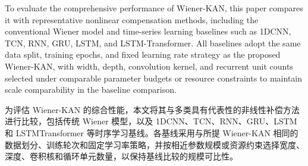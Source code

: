 \documentclass[sn-nature]{sn-jnl}
\newif\ifCNENEnglish
\newif\ifCNENBilingual
\newcommand{\CNEN}[2]{%
    \ifCNENBilingual
        #1%
        \if\relax\detokenize{#2}\relax\else\par #2\fi%
    \else
        \ifCNENEnglish
            #2%
        \else
            #1%
        \fi
    \fi
}
\begin{document}
\CNEN{为评估 Wiener-KAN 的综合性能，本文将其与多类具有代表性的非线性补偿方法进行比较，包括传统 Wiener 模型，以及 1DCNN、TCN、RNN、GRU、LSTM 和 LSTMTransformer 等时序学习基线。各基线采用与所提 Wiener-KAN 相同的数据划分、训练轮次和固定学习率策略，并按相近参数规模或资源约束选择宽度、深度、卷积核和循环单元数量，以保持基线比较的规模可比性。}{To evaluate the comprehensive performance of Wiener-KAN, this paper compares it with representative nonlinear compensation methods, including the conventional Wiener model and time-series learning baselines such as 1DCNN, TCN, RNN, GRU, LSTM, and LSTM-Transformer. All baselines adopt the same data split, training epochs, and fixed learning rate strategy as the proposed Wiener-KAN, with width, depth, convolution kernel, and recurrent unit counts selected under comparable parameter budgets or resource constraints to maintain scale comparability in the baseline comparison.%
}
\end{document}
